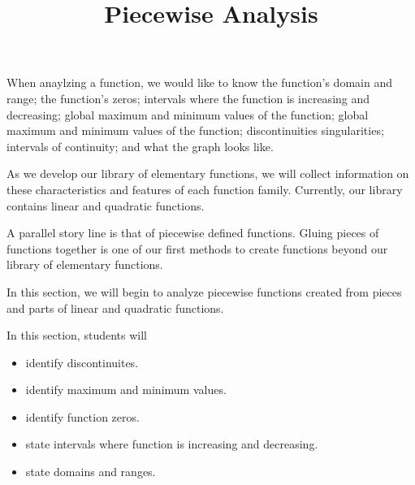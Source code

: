 \documentclass{ximera}
\title{Piecewise Analysis}
\begin{document}
\begin{abstract}
\end{abstract}
\maketitle




When anaylzing a function, we would like to know the function's domain and range; the function's zeros; intervals where the function is increasing and decreasing; global maximum and minimum values of the function; global maximum and minimum values of the function; discontinuities singularities; intervals of continuity; and what the graph looks like.



As we develop our library of elementary functions, we will collect information on these characteristics and features of each function family.  Currently, our library contains linear and quadratic functions.  

A parallel story line is that of piecewise defined functions.  Gluing pieces of functions together is one of our first methods to create functions beyond our library of elementary functions.

In this section, we will begin to analyze piecewise functions created from pieces and parts of linear and quadratic functions.



















\begin{sectionOutcomes}
In this section, students will 

\begin{itemize}
\item identify discontinuites.
\item identify maximum and minimum values.
\item identify function zeros.
\item state intervals where function is increasing and decreasing.
\item state domains and ranges.
\end{itemize}
\end{sectionOutcomes}
\end{document}

